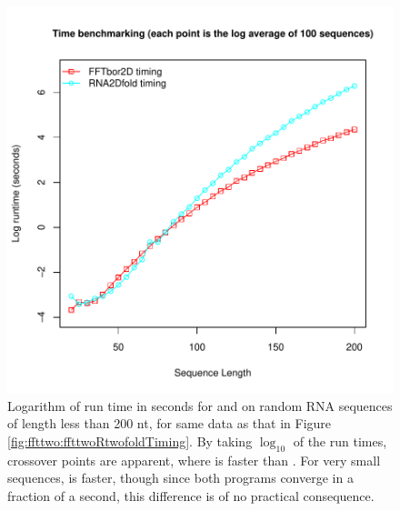 \begin{figure}[!ht]
\centering
\includegraphics[width=.9\textwidth]{Figures/FFTbor2D/ffttwoRtwofoldLogScale.pdf}
\caption{
Logarithm of run time in seconds for \rnatwofold and \ffttwo
on random RNA sequences of length less than 200 nt, for same data as that
in Figure \ref{fig:ffttwo:ffttwoRtwofoldTiming}.
By taking $\log_{10}$ of the run times,
crossover points are apparent,
where \ffttwo is faster than \rnatwofold. For very small
sequences, \rnatwofold is faster, though since both programs converge
in a fraction of a second, this difference is of no practical consequence.
}
\label{fig:ffttwo:ffttwoRtwofoldLogScale}
\end{figure}

